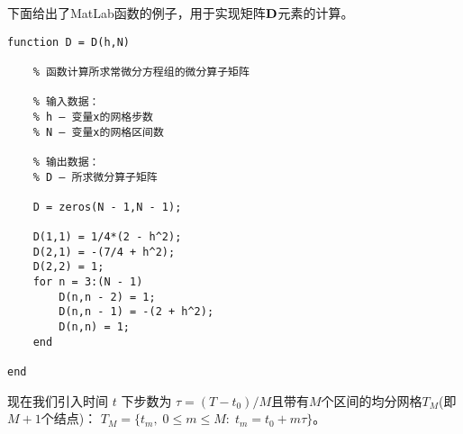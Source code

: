 \documentclass[twoside]{book}
\def\textbf{\bf}%
\begin{document}
\begin{CJK*}{GBK}{song}
下面给出了MatLab函数的例子，用于实现矩阵$\emph{\textbf{D}}$元素的计算。
%
\begin{lstlisting}
function D = D(h,N)

    % 函数计算所求常微分方程组的微分算子矩阵

    % 输入数据：
    % h – 变量x的网格步数
    % N – 变量x的网格区间数

    % 输出数据：
    % D – 所求微分算子矩阵

    D = zeros(N - 1,N - 1);

    D(1,1) = 1/4*(2 - h^2);
    D(2,1) = -(7/4 + h^2);
    D(2,2) = 1;
    for n = 3:(N - 1)
        D(n,n - 2) = 1;
        D(n,n - 1) = -(2 + h^2);
        D(n,n) = 1;
    end

end
\end{lstlisting}

现在我们引入时间 $t$ 下步数为 $\tau = (T - t_0)/M$且带有$M$个区间的均分网格$T_M$(即$M + 1$个结点)： $T_M = \{t_m, \; 0 \leqslant m \leqslant M: \; t_m = t_0 + m \tau\}$。


\end{CJK*}
\end{document}
